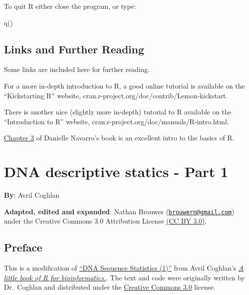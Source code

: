 \documentclass[
]{book}
\newenvironment{Shaded}{\begin{snugshade}}{\end{snugshade}}
\newcommand{\FunctionTok}[1]{\textcolor[rgb]{0.00,0.00,0.00}{#1}}
\newcommand{\NormalTok}[1]{#1}
\begin{document}
To quit R either close the program, or type:

\begin{Shaded}
\begin{Highlighting}[]
\FunctionTok{q}\NormalTok{()}
\end{Highlighting}
\end{Shaded}

\hypertarget{links-and-further-reading}{%
\section{Links and Further Reading}\label{links-and-further-reading}}

Some links are included here for further reading.

For a more in-depth introduction to R, a good online tutorial is available on the ``Kickstarting R'' website, cran.r-project.org/doc/contrib/Lemon-kickstart.

There is another nice (slightly more in-depth) tutorial to R available on the ``Introduction to R'' website, cran.r-project.org/doc/manuals/R-intro.html.

\href{https://learningstatisticswithr.com/book/introR.html}{Chapter 3} of Danielle Navarro's book is an excellent intro to the basics of R.

\hypertarget{dna-descriptive-statics---part-1}{%
\chapter{DNA descriptive statics - Part 1}\label{dna-descriptive-statics---part-1}}

\textbf{By}: Avril Coghlan

\textbf{Adapted, edited and expanded}: Nathan Brouwer (\href{mailto:brouwern@gmail.com}{\nolinkurl{brouwern@gmail.com}}) under the Creative Commons 3.0 Attribution License \href{https://creativecommons.org/licenses/by/3.0/}{(CC BY 3.0)}.

\hypertarget{preface-1}{%
\section{Preface}\label{preface-1}}

This is a modification of \href{https://a-little-book-of-r-for-bioinformatics.readthedocs.io/en/latest/src/chapter1.html}{``DNA Sequence Statistics (1)''} from Avril Coghlan's \href{https://a-little-book-of-r-for-bioinformatics.readthedocs.io/en/latest/index.html}{\emph{A little book of R for bioinformatics.}}. The text and code were originally written by Dr.~Coghlan and distributed under the \href{https://creativecommons.org/licenses/by/3.0/us/}{Creative Commons 3.0} license.
\end{document}
